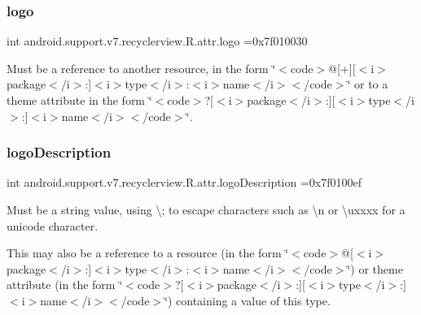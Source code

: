 \subsubsection{\texorpdfstring{logo}{logo}}
{\footnotesize\ttfamily int android.\+support.\+v7.\+recyclerview.\+R.\+attr.\+logo =0x7f010030\hspace{0.3cm}{\ttfamily [static]}}

Must be a reference to another resource, in the form \char`\"{}$<$code$>$@\mbox{[}+\mbox{]}\mbox{[}$<$i$>$package$<$/i$>$\+:\mbox{]}$<$i$>$type$<$/i$>$\+:$<$i$>$name$<$/i$>$$<$/code$>$\char`\"{} or to a theme attribute in the form \char`\"{}$<$code$>$?\mbox{[}$<$i$>$package$<$/i$>$\+:\mbox{]}\mbox{[}$<$i$>$type$<$/i$>$\+:\mbox{]}$<$i$>$name$<$/i$>$$<$/code$>$\char`\"{}. \mbox{\label{classandroid_1_1support_1_1v7_1_1recyclerview_1_1R_1_1attr_a31993158f7fc9cc8411e83a3742fbccc}} 
\subsubsection{\texorpdfstring{logo\+Description}{logoDescription}}
{\footnotesize\ttfamily int android.\+support.\+v7.\+recyclerview.\+R.\+attr.\+logo\+Description =0x7f0100ef\hspace{0.3cm}{\ttfamily [static]}}

Must be a string value, using \textquotesingle{}\textbackslash{};\textquotesingle{} to escape characters such as \textquotesingle{}\textbackslash{}n\textquotesingle{} or \textquotesingle{}\textbackslash{}uxxxx\textquotesingle{} for a unicode character. 

This may also be a reference to a resource (in the form \char`\"{}$<$code$>$@\mbox{[}$<$i$>$package$<$/i$>$\+:\mbox{]}$<$i$>$type$<$/i$>$\+:$<$i$>$name$<$/i$>$$<$/code$>$\char`\"{}) or theme attribute (in the form \char`\"{}$<$code$>$?\mbox{[}$<$i$>$package$<$/i$>$\+:\mbox{]}\mbox{[}$<$i$>$type$<$/i$>$\+:\mbox{]}$<$i$>$name$<$/i$>$$<$/code$>$\char`\"{}) containing a value of this type. \mbox{\label{classandroid_1_1support_1_1v7_1_1recyclerview_1_1R_1_1attr_a3a98399052a2eeecb97c4f3ae0463cae}} 
